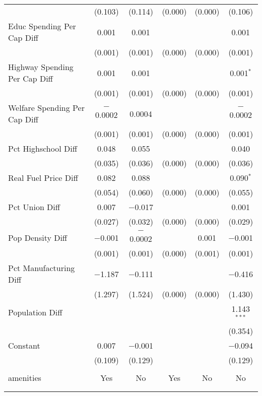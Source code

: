 \begin{table}[!htbp]
\begin{tabular}{@{\extracolsep{5pt}}lccccc}
  & (0.103) & (0.114) & (0.000) & (0.000) & (0.106) \\ 
  Educ Spending Per Cap Diff & 0.001 & 0.001 &  &  & 0.001 \\ 
  & (0.001) & (0.001) & (0.000) & (0.000) & (0.001) \\ 
  Highway Spending Per Cap Diff & 0.001 & 0.001 &  &  & 0.001$^{*}$ \\ 
  & (0.001) & (0.001) & (0.000) & (0.000) & (0.001) \\ 
  Welfare Spending Per Cap Diff & $-$0.0002 & 0.0004 &  &  & $-$0.0002 \\ 
  & (0.001) & (0.001) & (0.000) & (0.000) & (0.001) \\ 
  Pct Highschool Diff & 0.048 & 0.055 &  &  & 0.040 \\ 
  & (0.035) & (0.036) & (0.000) & (0.000) & (0.036) \\ 
  Real Fuel Price Diff & 0.082 & 0.088 &  &  & 0.090$^{*}$ \\ 
  & (0.054) & (0.060) & (0.000) & (0.000) & (0.055) \\ 
  Pct Union Diff & 0.007 & $-$0.017 &  &  & 0.001 \\ 
  & (0.027) & (0.032) & (0.000) & (0.000) & (0.029) \\ 
  Pop Density Diff & $-$0.001 & $-$0.0002 &  & 0.001 & $-$0.001 \\ 
  & (0.001) & (0.001) & (0.000) & (0.001) & (0.001) \\ 
  Pct Manufacturing Diff & $-$1.187 & $-$0.111 &  &  & $-$0.416 \\ 
  & (1.297) & (1.524) & (0.000) & (0.000) & (1.430) \\ 
  Population Diff &  &  &  &  & 1.143$^{***}$ \\ 
  &  &  &  &  & (0.354) \\ 
  Constant & 0.007 & $-$0.001 &  &  & $-$0.094 \\ 
  & (0.109) & (0.129) &  &  & (0.129) \\ 
 \hline \\[-1.8ex] 
amenities & Yes & No & Yes & No & No \\ 
\hline \\[-1.8ex] 
\hline 
\hline \\[-1.8ex] 
\end{tabular} 
\end{table} 

